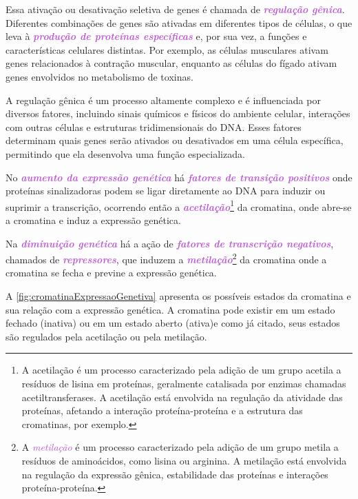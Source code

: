\documentclass[11pt,a4paper]{article}
\newcounter{exemplo}
\begin{document}
	Essa ativação ou desativação seletiva de genes é chamada de \textcolor{MediumOrchid}{\textbf{\textit{regulação gênica}}}. Diferentes combinações de genes são ativadas em diferentes tipos de células, o que leva à \textcolor{MediumOrchid}{\textbf{\textit{produção de proteínas específicas}}} e, por sua vez, a funções e características celulares distintas. Por exemplo, as células musculares ativam genes relacionados à contração muscular, enquanto as células do fígado ativam genes envolvidos no metabolismo de toxinas.

	A regulação gênica é um processo altamente complexo e é influenciada por diversos fatores, incluindo sinais químicos e físicos do ambiente celular, interações com outras células e estruturas tridimensionais do DNA. Esses fatores determinam quais genes serão ativados ou desativados em uma célula específica, permitindo que ela desenvolva uma função especializada.

	No \textcolor{MediumOrchid}{\textbf{\textit{aumento da expressão genética}}} há \textcolor{MediumOrchid}{\textbf{\textit{fatores de transição positivos}}} onde proteínas sinalizadoras podem se ligar diretamente ao DNA para induzir ou suprimir a transcrição, ocorrendo então a \textcolor{MediumOrchid}{\textbf{\textit{acetilação}}}\footnote{A acetilação é um processo caracterizado pela adição de um grupo acetila a resíduos de lisina em proteínas, geralmente catalisada por enzimas chamadas acetiltransferases. A acetilação está envolvida na regulação da atividade das proteínas, afetando a interação proteína-proteína e a estrutura das cromatinas, por exemplo.} da cromatina, onde abre-se a cromatina e induz a expressão genética.

	Na \textcolor{MediumOrchid}{\textbf{\textit{diminuição genética}}} há a ação de \textcolor{MediumOrchid}{\textbf{\textit{fatores de transcrição negativos}}}, chamados de \textcolor{MediumOrchid}{\textbf{\textit{repressores}}}, que induzem a \textcolor{MediumOrchid}{\textbf{\textit{metilação}}}\footnote{A \textcolor{MediumOrchid}{\textit{metilação}} é um processo caracterizado pela adição de um grupo metila a resíduos de aminoácidos, como lisina ou arginina. A metilação está envolvida na regulação da expressão gênica, estabilidade das proteínas e interações proteína-proteína.} da cromatina onde a cromatina se fecha e previne a expressão genética. 

	A \ref{fig:cromatinaExpressaoGenetiva} apresenta os possíveis estados da cromatina e sua relação com a expressão genética. A cromatina pode existir em um estado fechado (inativa) ou em um estado aberto (ativa)e como já citado, seus estados são regulados pela acetilação ou pela metilação.
\end{document}
